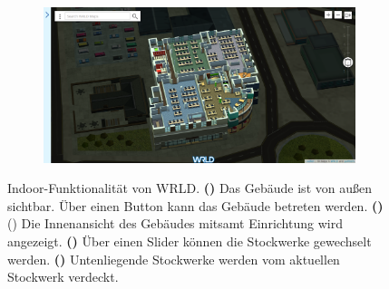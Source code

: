 \begin{figure}[h]
\begin{subfigure}{0.49\textwidth}
        \caption{}
        \label{sfig:wrld_indoor_transition}
    \end{subfigure}
    \hfill
    \begin{subfigure}{0.49\textwidth}
        \includegraphics[width=\textwidth]{figures/wrdl_indoor_2.png}
        \caption{}
        \label{sfig:wrld_indoor_2}
    \end{subfigure}
    \caption{Indoor-Funktionalität von WRLD.\@ %
        \textbf{()} Das Gebäude ist von außen sichtbar. %
        Über einen Button kann das Gebäude betreten werden. %
        \textbf{()}() Die Innenansicht des Gebäudes mitsamt Einrichtung wird angezeigt. %
        \textbf{()} Über einen Slider können die Stockwerke gewechselt werden. %
        \textbf{()} Untenliegende Stockwerke werden vom aktuellen Stockwerk verdeckt.%
    }
    \label{fig:wrld_indoor}
\end{figure}

